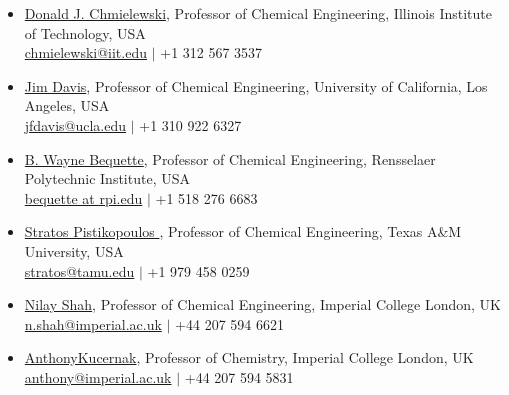 \documentclass[11pt,a4paper]{article}
\newcommand*{\boldname}[3]{%
    \def\lastname{#1}%
    \def\firstname{#2}%
    \def\firstinit{#3}}
\begin{document}
\vspace{-18mm}
\nocite{*}
\renewcommand{\refname}{}
\setlength{\baselineskip}{0mm}
\setlength\bibitemsep{0mm}
\boldname{Manthanwar}{Amit M.}{A. M.}
\printbibliography


\vspace{4mm}
\begin{itemize}[label=$\bullet$,leftmargin=10mm,itemsep=2mm]
    \item {\href{https://www.iit.edu/directory/people/donald-chmielewski}{Donald J. Chmielewski}}, Professor of Chemical Engineering, Illinois Institute of Technology, USA\\
          \href{mailto:chmielewski@iit.edu}{chmielewski@iit.edu} $|$ +1 312 567 3537

    \item {\href{https://samueli.ucla.edu/people/james-davis/}{Jim Davis}}, Professor of Chemical Engineering, University of California, Los Angeles, USA\\
          \href{mailto:jfdavis@ucla.edu}{jfdavis@ucla.edu} $|$ +1 310 922 6327

    \item {\href{https://homepages.rpi.edu/~bequeb/}{B. Wayne Bequette}}, Professor of Chemical Engineering, Rensselaer Polytechnic Institute, USA\\
          \href{mailto:bequette at rpi.edu}{bequette at rpi.edu} $|$ +1 518 276 6683

    \item {\href{https://engineering.tamu.edu/chemical/profiles/pistikopoulos-stratos.html}{Stratos Pistikopoulos }}, Professor of Chemical Engineering, Texas A\&M University, USA\\
          \href{mailto:stratos@tamu.edu}{stratos@tamu.edu} $|$ +1 979 458 0259

    \item {\href{https://www.imperial.ac.uk/people/n.shah}{Nilay Shah}}, Professor of Chemical Engineering, Imperial College London, UK\\
          \href{mailto:n.shah@imperial.ac.uk}{n.shah@imperial.ac.uk} $|$ +44 207 594 6621

    \item {\href{https://www.imperial.ac.uk/people/anthony}{AnthonyKucernak}}, Professor of Chemistry, Imperial College London, UK\\
          \href{mailto:anthony@imperial.ac.uk}{anthony@imperial.ac.uk} $|$ +44 207 594 5831
\end{itemize}
\end{document}
